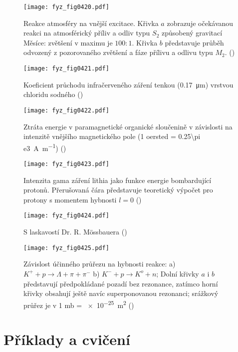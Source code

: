     \begin{figure}[ht!] %
      \centering
      \texttt{[image: fyz\_fig0420.pdf]}
      \caption{Reakce atmosféry na vnější excitace. Křivka \(a\) zobrazuje očekávanou reakci na
              atmosférický příliv a odliv typu \(S_2\) způsobený gravitací Měsíce: zvětšení v maximu
              je \(100:1\). Křivka \(b\) představuje průběh odvozený z pozorovaného zvětšení a fáze
              přílivu a odlivu typu \(M_2\). (\cite[s.~318]{Feynman01})}
      \label{fyz:fig0420}
    \end{figure}

    \begin{figure}[ht!] %
      \centering
      \texttt{[image: fyz\_fig0421.pdf]}
      \caption{Koeficient průchodu infračerveného záření tenkou (\qty{0.17}{\micro\m}) vrstvou
               chloridu sodného (\cite[s.~319]{Feynman01})}
      \label{fyz:fig0421}
    \end{figure}
  
    \begin{figure}[ht!] %
      \centering
      \texttt{[image: fyz\_fig0422.pdf]}
      \caption{Ztráta energie v paramagnetické organické sloučenině v závislosti na intenzitě
               vnějšího magnetického pole (1 oersted = \qty{0.25\pi e3}{\ampere\per\meter})
               (\cite[s.~320]{Feynman01})}
      \label{fyz:fig0422}
    \end{figure}
  
    \begin{figure}[ht!] %
      \centering
      \texttt{[image: fyz\_fig0423.pdf]}
      \caption{Intenzita gama záření lithia jako funkce energie bombardující protonů. Přerušovaná 
               čára představuje teoretický výpočet pro protony s momentem hybnosti \(l=0\)
               (\cite[s.~320]{Feynman01})}
      \label{fyz:fig0423}
    \end{figure}
  
    \begin{figure}[ht!] %
      \centering
      \texttt{[image: fyz\_fig0424.pdf]}
      \caption{S laskavostí Dr. R. M\"{o}ssbauera
               (\cite[s.~321]{Feynman01})}
      \label{fyz:fig0424}
    \end{figure}
  
    \begin{figure}[ht!] %
      \centering
      \texttt{[image: fyz\_fig0425.pdf]}
      \caption{Závislost účinného průřezu na hybnosti reakce: a) \(K^+ + p \rightarrow \Lambda + \pi
              + \pi^-\) b) \(K^- + p \rightarrow K^o + n\); Dolní křivky \(a\) i \(b\) představují
              předpokládané pozadí bez rezonance, zatímco horní křivky obsahují ještě navíc
              superponovanou rezonanci; srážkový průřez je v 1 mb = \qty{e-25}{\m\squared}
              (\cite[s.~321]{Feynman01})}
      \label{fyz:fig0425}
    \end{figure}

  \section{Příklady a cvičení}\label{fyz:IchapXXIIIsecV}

